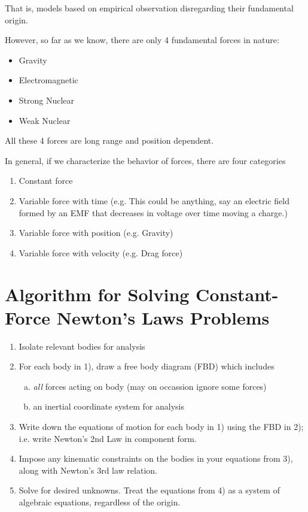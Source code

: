 That is, models based on empirical observation disregarding their fundamental origin.

However, so far as we know, there are only 4 fundamental forces in nature:

\begin{itemize}
	\item Gravity
	\item Electromagnetic
	\item Strong Nuclear
	\item Weak Nuclear
\end{itemize}

All these 4 forces are long range and position dependent.

In general, if we characterize the behavior of forces, there are four categories

\begin{enumerate}
	\item Constant force
	\item Variable force with time (e.g. This could be anything, say an electric field formed by an EMF that decreases in voltage over time moving a charge.)
	\item Variable force with position (e.g. Gravity)
	\item Variable force with velocity (e.g. Drag force)
\end{enumerate}

\section{Algorithm for Solving Constant-Force Newton's Laws Problems}

\begin{enumerate}[1)]
	\item Isolate relevant bodies for analysis
	\item For each body in 1), draw a free body diagram (FBD) which includes
	
	\begin{enumerate}[(a)]
		\item \textit{all} forces acting on body (may on occassion ignore some forces)
		\item an inertial coordinate system for analysis
	\end{enumerate}
	\item Write down the equations of motion for each body in 1) using the FBD in 2); i.e. write Newton's 2nd Law in component form.
	\item Impose any kinematic constraints on the bodies in your equations from 3), along with Newton's 3rd law relation.
	\item Solve for desired unknowns. Treat the equations from 4) as a system of algebraic equations, regardless of the origin.
\end{enumerate}

